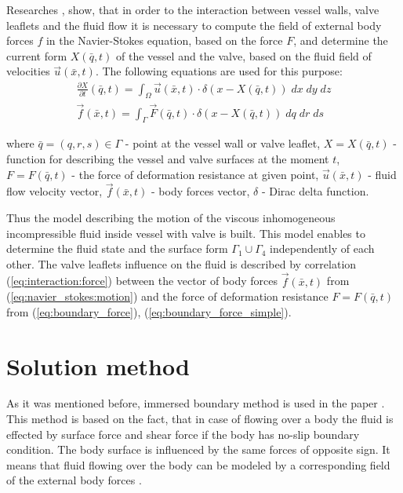 \documentclass[runningheads,a4paper]{llncs}
\begin{document}
Researches \cite{pescin_1977}, \cite{boyce_2011} show, that in order to the interaction between vessel walls, valve leaflets and the fluid flow it is necessary
to compute the field of external body forces $f$ in the Navier-Stokes equation, based on the force $F$, and determine the current form $X(\bar{q}, t)$ 
of the vessel and the valve, based on the fluid field of velocities $\vec{u}(\bar{x}, t)$. The following equations are used for this purpose:
\begin{gather}
    \label{eq:interaction:velocity}
    \frac{\partial X}{\partial t}(\bar{q}, t) = \int_{\Omega} \vec{u}(\bar{x}, t) \cdot \delta (x - X(\bar{q}, t))\; dx\; dy\; dz\\
    \label{eq:interaction:force}
    \vec{f}(\bar{x}, t) = \int_{\Gamma} \vec{F}(\bar{q}, t) \cdot \delta (x - X(\bar{q}, t))\; dq\; dr\; ds
\end{gather}

where $\bar{q} = (q, r, s) \in \Gamma$ - point at the vessel wall or valve leaflet, $X = X(\bar{q}, t)$ - function for describing the vessel
and valve surfaces at the moment $t$, $F = F(\bar{q}, t)$ - the force of deformation resistance at given point,
$\vec{u}(\bar{x}, t)$ - fluid flow velocity vector, $\vec{f}(\bar{x}, t)$ - body forces vector, $\delta$ - Dirac delta function.

Thus the model describing the motion of the viscous inhomogeneous incompressible fluid inside vessel with valve is built. This model enables to determine
the fluid state and the surface form $\Gamma_1 \cup \Gamma_4$ independently of each other. The valve leaflets influence on the fluid is described by 
correlation (\ref{eq:interaction:force}) between the vector of body forces $\vec{f}(\bar{x}, t)$ from (\ref{eq:navier_stokes:motion}) 
and the force of deformation resistance $F = F(\bar{q}, t)$ from (\ref{eq:boundary_force}), (\ref{eq:boundary_force_simple}).

\section{Solution method}

As it was mentioned before, immersed boundary method is used in the paper \cite{pescin_1977}. This method is based on the fact, that in case of flowing 
over a body the fluid is effected by surface force and shear force if the body has no-slip boundary condition. The body surface is influenced by the same
forces of opposite sign. It means that fluid flowing over the body can be modeled by a corresponding field of the external body forces \cite{goldstain}.
\end{document}
